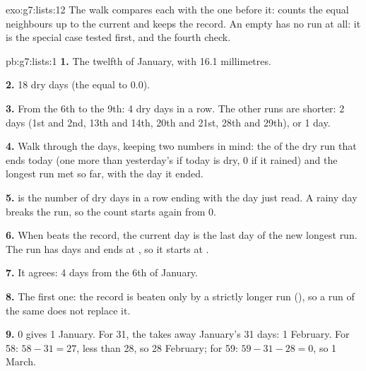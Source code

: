 \begin{solution}{exo:g7:lists:12}
The walk compares each  with the one before it:  counts the
equal neighbours up to the current  and  keeps the record.
An empty  has no run at all: it is the special case tested first, and the
fourth check.

\label{lst:g7:lists:sol-longest-equal}
\end{solution}

\begin{solution}{pb:g7:lists:1}
\textbf{1.} The twelfth of January, with 16.1 millimetres.

\textbf{2.} 18 dry days (the  equal to 0.0).

\textbf{3.} From the 6th to the 9th: 4 dry days in a row. The other runs are
shorter: 2 days (1st and 2nd, 13th and 14th, 20th and 21st, 28th and 29th),
or 1 day.

\textbf{4.} Walk through the days, keeping two numbers in mind: the  of
the dry run that ends today (one more than yesterday's if today is dry, 0 if
it rained) and the longest run met so far, with the day it ended.

\textbf{5.}  is the number of dry days in a row ending with the day
just read. A rainy day breaks the run, so the count starts again from 0.

\textbf{6.} When  beats the record, the current day is the last day
of the new longest run. The run has  days and ends at 
, so it starts at .

\textbf{7.} It agrees: 4 days from the 6th of January.

\label{out:g7:lists:dry-spell}

\textbf{8.} The first one: the record is beaten only by a strictly longer run
(), so a run of the same  does not replace it.

\textbf{9.}  0 gives 1 January. For 31, the  takes away January's 31
days: 1 February. For 58: $58 - 31 = 27$, less than 28, so 28 February; for 59:
$59 - 31 - 28 = 0$, so 1 March.


\end{solution}
